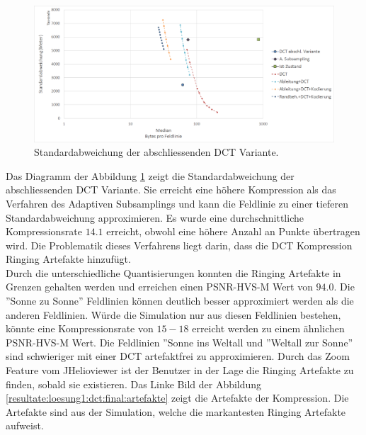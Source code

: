 \begin{figure}[!htbp]
	\center	\includegraphics[width=1\textwidth,keepaspectratio]{./pictures/resultate/loesung1/loesung1-12/resultate.png}
	\caption{Standardabweichung der abschliessenden DCT Variante.}	\label{resultate:loesung1:dct:abschliessend:standardabweichung}
\end{figure} 
Das Diagramm der Abbildung \ref{resultate:loesung1:dct:abschliessend:standardabweichung} zeigt die Standardabweichung der abschliessenden DCT Variante. Sie erreicht eine höhere Kompression als das Verfahren des Adaptiven Subsamplings und kann die Feldlinie zu einer tieferen Standardabweichung approximieren. Es wurde eine durchschnittliche Kompressionsrate $14.1$ erreicht, obwohl eine höhere Anzahl an Punkte übertragen wird. Die Problematik dieses Verfahrens liegt darin, dass die DCT Kompression Ringing Artefakte hinzufügt.\\
Durch die unterschiedliche Quantisierungen konnten die Ringing Artefakte in Grenzen gehalten werden und erreichen einen PSNR-HVS-M  Wert von $94.0$. Die ''Sonne zu Sonne'' Feldlinien können deutlich besser approximiert werden als die anderen Feldlinien. Würde die Simulation nur aus diesen Feldlinien bestehen, könnte eine Kompressionsrate von $15-18$ erreicht werden zu einem ähnlichen PSNR-HVS-M Wert. Die Feldlinien ''Sonne ins Weltall und ''Weltall zur Sonne'' sind schwieriger mit einer DCT artefaktfrei zu approximieren.  Durch das Zoom Feature vom JHelioviewer ist der Benutzer in der Lage die Ringing Artefakte zu finden, sobald sie existieren. Das Linke Bild der Abbildung \ref{resultate:loesung1:dct:final:artefakte} zeigt die Artefakte der Kompression. Die Artefakte sind aus der Simulation, welche die markantesten Ringing Artefakte aufweist.

